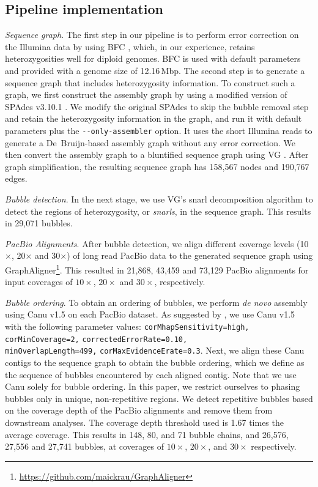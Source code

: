 \subsection{Pipeline implementation}
\textit{Sequence graph}.
The first step in our pipeline is to perform error correction on the Illumina data by using BFC \citep{li2015bfc}, which, in our experience, retains heterozygosities well for diploid genomes.
BFC is used with default parameters and provided with a genome size of 12.16\,Mbp.
The second step is to generate a sequence graph that includes heterozygosity information.
To construct such a graph, we first construct the assembly graph by using a modified version of SPAdes v3.10.1 \citep{bankevich2012spades}.
We modify the original SPAdes to skip the bubble removal step and retain the heterozygosity information in the graph, and run it with default parameters plus the \texttt{{-}{-}only-assembler} option.
It uses the short Illumina reads to generate a De~Bruijn-based assembly graph without any error correction.
We then convert the assembly graph to a bluntified sequence graph using VG \citep{garrison2017sequence}.
After graph simplification, the resulting sequence graph has 158,567 nodes and 190,767 edges.

\textit{Bubble detection}. In the next stage, we use VG's snarl decomposition algorithm \citep{paten2017superbubbles} to detect the regions of heterozygosity, or \textit{snarls}, in the sequence graph. This results in 29,071 bubbles.

\textit{PacBio Alignments}. After bubble detection, we align different coverage levels (10$\times$, 20$\times$ and 30$\times$) of long read PacBio data to the generated sequence graph using GraphAligner\footnote{\url{https://github.com/maickrau/GraphAligner}}.
This resulted in 21,868, 43,459 and 73,129 PacBio alignments for input coverages of $10\times$, $20\times$ and $30\times$, respectively.

\textit{Bubble ordering}. To obtain an ordering of bubbles, we perform \textit{de novo} assembly using Canu v1.5 \citep{koren2017canu} on each PacBio dataset.
As suggested by \cite{giordano2017novo}, we use Canu v1.5 with the following parameter values: \texttt{corMhapSensitivity=high,} \texttt{corMinCoverage=2,} \texttt{correctedErrorRate=0.10,}\\
\texttt{minOverlapLength=499,} \texttt{corMaxEvidenceErate=0.3}.
Next, we align these Canu contigs to the sequence graph to obtain the bubble ordering, which we define as the sequence of bubbles encountered by each aligned contig.
Note that we use Canu solely for bubble ordering.
In this paper, we restrict ourselves to phasing bubbles only in unique, non-repetitive regions.
We detect repetitive bubbles based on the coverage depth of the PacBio alignments and remove them from downstream analyses.
The coverage depth threshold used is 1.67 times the average coverage.
This results in 148, 80, and 71 bubble chains, and 26,576, 27,556 and 27,741 bubbles, at coverages of $10\times$, $20\times$, and $30\times$ respectively.

